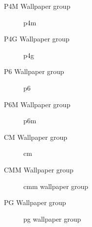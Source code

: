 \documentclass{beamer}
\theoremstyle{definition}
\begin{document}
\begin{frame}{P4M Wallpaper group}
    \begin{figure}
        \centering
        
        \caption{p4m}
        \label{fig:p4m}
    \end{figure}
\end{frame}

\begin{frame}{P4G Wallpaper group}
    \begin{figure}
        \centering
        
        \caption{p4g}
        \label{fig:p4g}
    \end{figure}
\end{frame}


\begin{frame}{P6 Wallpaper group}
    \begin{figure}
        \centering
        
        \caption{p6}
        \label{fig:p3}
    \end{figure}
\end{frame}

\begin{frame}{P6M Wallpaper group}
    \begin{figure}
        \centering
        
        \caption{p6m}
        \label{fig:p3m}
    \end{figure}
\end{frame}

\begin{frame}{CM Wallpaper group}
    \begin{figure}
        \centering
        
        \caption{cm}
        \label{fig:cm}
    \end{figure}
\end{frame}

\begin{frame}{CMM Wallpaper group}
    \begin{figure}
        \centering
        
        \caption{cmm wallpaper group}
        \label{fig:cm}
    \end{figure}
\end{frame}

\begin{frame}{PG Wallpaper group}
    \begin{figure}
        \centering
        
        \caption{pg wallpaper group}
        \label{fig:pg}
    \end{figure}
\end{frame}
\end{document}
